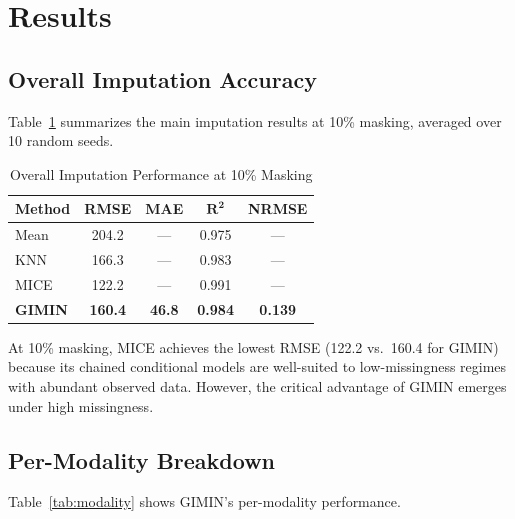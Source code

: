 \documentclass[journal,twoside,web]{ieeecolor}
\begin{document}
\section{Results}
\label{sec:results}

\subsection{Overall Imputation Accuracy}

Table~\ref{tab:overall} summarizes the main imputation results at 10\% masking, averaged over 10 random seeds.

\begin{table}[t]
\centering
\caption{Overall Imputation Performance at 10\% Masking}
\label{tab:overall}
\begin{tabular}{lcccc}
\toprule
\textbf{Method} & \textbf{RMSE} & \textbf{MAE} & $\boldsymbol{R^2}$ & \textbf{NRMSE} \\
\midrule
Mean     & 204.2 & --- & 0.975 & --- \\
KNN      & 166.3 & --- & 0.983 & --- \\
MICE     & 122.2 & --- & 0.991 & --- \\
\textbf{GIMIN} & \textbf{160.4} & \textbf{46.8} & \textbf{0.984} & \textbf{0.139} \\
\bottomrule
\end{tabular}
\end{table}

At 10\% masking, MICE achieves the lowest RMSE (122.2 vs.\ 160.4 for GIMIN) because its chained conditional models are well-suited to low-missingness regimes with abundant observed data. However, the critical advantage of GIMIN emerges under high missingness.

\subsection{Per-Modality Breakdown}

Table~\ref{tab:modality} shows GIMIN's per-modality performance.
\end{document}

